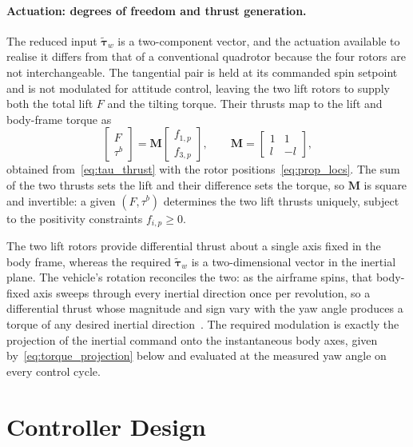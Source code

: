 \paragraph{Actuation: degrees of freedom and thrust generation.}
The reduced input $\tilde{\boldsymbol{\tau}}_w$ is a two-component vector, and
the actuation available to realise it differs from that of a conventional
quadrotor because the four rotors are not interchangeable.  The tangential
pair is held at its commanded spin setpoint and is not modulated for attitude
control, leaving the two lift rotors to supply both the total lift $F$ and the
tilting torque.  Their thrusts map to the lift and body-frame torque as
\begin{equation}
    \begin{bmatrix}F\\\tau^b\end{bmatrix}
    = \boldsymbol{M}
      \begin{bmatrix}f_{1,p}\\f_{3,p}\end{bmatrix},
    \qquad
    \boldsymbol{M} = \begin{bmatrix}
        1 & 1 \\[2pt]
        l & -l
    \end{bmatrix},
    \label{eq:input_map}
\end{equation}
obtained from~\eqref{eq:tau_thrust} with the rotor
positions~\eqref{eq:prop_locs}.  The sum of the two thrusts sets the lift and
their difference sets the torque, so $\boldsymbol{M}$ is square and invertible:
a given $(F,\tau^b)$ determines the two lift thrusts uniquely, subject to the
positivity constraints $f_{i,p}\geq 0$.

The two lift rotors provide differential thrust about a single axis fixed in
the body frame, whereas the required $\tilde{\boldsymbol{\tau}}_w$ is a
two-dimensional vector in the inertial plane.  The vehicle's rotation
reconciles the two: as the airframe spins, that body-fixed axis sweeps through
every inertial direction once per revolution, so a differential thrust whose
magnitude and sign vary with the yaw angle produces a torque of any desired
inertial direction~\cite{bai2020splitflyer,bai2022splitflyerair}.  The
required modulation is exactly the projection of the inertial command onto the
instantaneous body axes, given by~\eqref{eq:torque_projection} below and
evaluated at the measured yaw angle on every control cycle.

\section{Controller Design}
\label{sec:controller}

